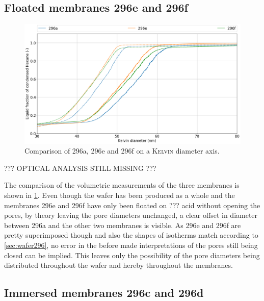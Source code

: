 \documentclass[thesis.tex]{subfiles}
\begin{document}
        \subsection{Floated membranes 296e and 296f}
        \label{subsec:floated-membranes}

            \begin{figure}[ht]
                \centering
                \includegraphics[width=\textwidth]{images/296a_vs_296e_vs_296f_d_kelvin.png}
                \caption{Comparison of 296a, 296e and 296f on a \textsc{Kelvin} diameter axis. }
                \label{fig:floated-comp-w296}
            \end{figure}

            ??? OPTICAL ANALYSIS STILL MISSING ???

            The comparison of the volumetric measurements of the three membranes is shown in \cref{fig:floated-comp-w296}. Even though the wafer has been produced as a whole and the membranes 296e and 296f have only been floated on ??? acid without opening the pores, by theory leaving the pore diameters unchanged, a clear offset in diameter between 296a and the other two membranes is visible. As 296e and 296f are pretty superimposed though and also the shapes of isotherms match according to \cref{sec:wafer296}, no error in the before made interpretations of the pores still being closed can be implied. This leaves only the possibility of the pore diameters being distributed throughout the wafer and hereby throughout the membranes.


        \subsection{Immersed membranes 296c and 296d}
        \label{subsec:immersed-membranes}
\end{document}
